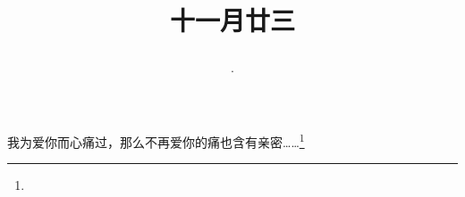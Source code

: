 \title{\date[d=23,m=12,y=2024][year:cn-y,年,month:cn,day:cn,日,·,weekday]·十一月廿三 }
我为爱你而心痛过，那么不再爱你的痛也含有亲密……\footnote{ }

